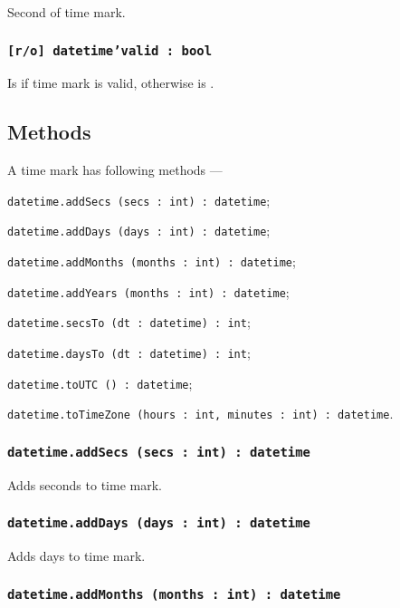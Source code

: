 Second of time mark.

\subsubsection{\texttt{[r/o] datetime'valid : bool}}

Is \true{} if time mark is valid, otherwise is \false.

\subsection{Methods}

A time mark has following methods —
\begin{icItems}
	\item \texttt{datetime.addSecs (secs : int) : datetime};
	\item \texttt{datetime.addDays (days : int) : datetime};
	\item \texttt{datetime.addMonths (months : int) : datetime};
	\item \texttt{datetime.addYears (months : int) : datetime};
	\item \texttt{datetime.secsTo (dt : datetime) : int};
	\item \texttt{datetime.daysTo (dt : datetime) : int};
	\item \texttt{datetime.toUTC () : datetime};
	\item \texttt{datetime.toTimeZone (hours : int, minutes : int) : datetime}.
\end{icItems}

\subsubsection{\texttt{datetime.addSecs (secs : int) : datetime}}

Adds seconds to time mark.

\subsubsection{\texttt{datetime.addDays (days : int) : datetime}}

Adds days to time mark.

\subsubsection{\texttt{datetime.addMonths (months : int) : datetime}}

